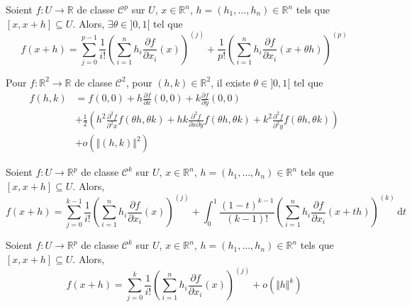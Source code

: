   \begin{theorem}
    Soient $f : U \rightarrow \mathbb{R}$ de classe $\mathcal{C}^p$ sur $U$, $x \in \mathbb{R}^n$, $h = (h_1, \dots, h_n) \in \mathbb{R}^n$ tels que $[x,x+h] \subseteq U$. Alors, $\exists \theta \in ]0,1[$ tel que
    \[ f(x+h) = \sum_{j=0}^{p-1} \frac{1}{i!} \left( \sum_{i=1}^n h_i \frac{\partial f}{\partial x_i} (x) \right)^{(j)} + \frac{1}{p!} \left( \sum_{i=1}^n h_i \frac{\partial f}{\partial x_i} (x + \theta h) \right)^{(p)} \]
  \end{theorem}

  \begin{example}
    Pour $f : \mathbb{R}^2 \rightarrow \mathbb{R}$ de classe $\mathcal{C}^2$, pour $(h, k) \in \mathbb{R}^2$, il existe $\theta \in ]0,1[$ tel que
    \begin{align*}
      f(h,k) &= f(0,0) + h \frac{\partial f}{\partial x}(0,0) + k \frac{\partial f}{\partial y}(0,0) \\
      &+ \frac{1}{2} \left( h^2 \frac{\partial^2 f}{\partial^2 x} f(\theta h, \theta k) + hk \frac{\partial^2 f}{\partial x \partial y} f(\theta h, \theta k) + k^2 \frac{\partial^2 f}{\partial^2 y} f(\theta h, \theta k) \right) \\
      &+ o(\Vert (h,k) \Vert^2)
    \end{align*}
  \end{example}

  \begin{theorem}
    Soient $f : U \rightarrow \mathbb{R}^p$ de classe $\mathcal{C}^k$ sur $U$, $x \in \mathbb{R}^n$, $h = (h_1, \dots, h_n) \in \mathbb{R}^n$ tels que $[x,x+h] \subseteq U$. Alors,
    \[ f(x+h) = \sum_{j=0}^{k-1} \frac{1}{i!} \left( \sum_{i=1}^n h_i \frac{\partial f}{\partial x_i} (x) \right)^{(j)} + \int_0^1 \frac{(1-t)^{k-1}}{(k-1)!} \left( \sum_{i=1}^{n} h_i \frac{\partial f}{\partial x_i} (x+th) \right)^{(k)} \, \mathrm{d}t \]
  \end{theorem}

  \begin{theorem}
    Soient $f : U \rightarrow \mathbb{R}^p$ de classe $\mathcal{C}^k$ sur $U$, $x \in \mathbb{R}^n$, $h = (h_1, \dots, h_n) \in \mathbb{R}^n$ tels que $[x,x+h] \subseteq U$. Alors,
    \[ f(x+h) = \sum_{j=0}^{k} \frac{1}{i!} \left( \sum_{i=1}^n h_i \frac{\partial f}{\partial x_i} (x) \right)^{(j)} + o(\Vert h \Vert^k) \]
  \end{theorem}

